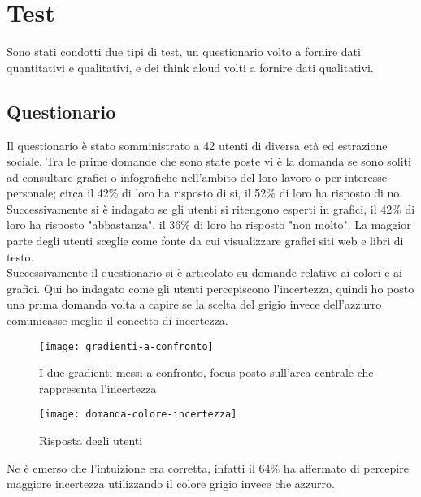 \section{Test}
Sono stati condotti due tipi di test, un questionario volto a fornire dati quantitativi e qualitativi, e dei think aloud volti a fornire dati qualitativi. \\

\subsection{Questionario}
Il questionario è stato somministrato a 42 utenti di diversa età ed estrazione sociale. Tra le prime domande che sono state poste vi è la domanda se sono soliti ad consultare grafici o infografiche nell'ambito del loro lavoro o per interesse personale; circa il 42\% di loro ha risposto di si, il 52\% di loro ha risposto di no. Successivamente si è indagato se gli utenti si ritengono esperti in grafici, il 42\% di loro ha risposto "abbastanza", il 36\% di loro ha risposto "non molto". La maggior parte degli utenti sceglie come fonte da cui visualizzare grafici siti web e libri di testo.\\
Successivamente il questionario si è articolato su domande relative ai colori e ai grafici. Qui ho indagato come gli utenti percepiscono l'incertezza, quindi ho posto una prima domanda volta a capire se la scelta del grigio invece dell'azzurro comunicasse meglio il concetto di incertezza. 

\begin{figure}[!ht] 
    \centering 
    \texttt{[image: gradienti-a-confronto]} 
    \caption{I due gradienti messi a confronto, focus posto sull'area centrale che rappresenta l'incertezza}
\end{figure}


\begin{figure}[!ht] 
    \centering 
    \texttt{[image: domanda-colore-incertezza]}
    \caption{Risposta degli utenti}
\end{figure}

Ne è emerso che l'intuizione era corretta, infatti il 64\% ha affermato di percepire maggiore incertezza utilizzando il colore grigio invece che azzurro. 

